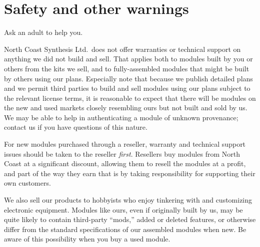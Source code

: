
%
%
%
%
%
%

\chapter{Safety and other warnings}

Ask an adult to help you.

North Coast Synthesis Ltd.\ does not offer warranties or technical support
on anything we did not build and sell.  That applies both to modules built
by you or others from the kits we sell, and to fully-assembled modules that
might be built by others using our plans.  Especially note that because we
publish detailed plans and we permit third parties to build and sell modules
using our plans subject to the relevant license terms, it is reasonable to
expect that there will be modules on the new and used markets closely
resembling ours but not built and sold by us.  We may be able to help in
authenticating a module of unknown provenance; contact us if you have
questions of this nature.

For new modules purchased through a reseller, warranty and technical support
issues should be taken to the reseller \emph{first}.  Resellers buy modules
from North Coast at a significant discount, allowing them to resell the
modules at a profit, and part of the way they earn that is by taking
responsibility for supporting their own customers.

We also sell our products to hobbyists who enjoy tinkering with and
customizing electronic equipment.  Modules like ours, even if originally
built by us, may be quite likely to contain third-party ``mods,'' added or
deleted features, or otherwise differ from the standard specifications of
our assembled modules when new.  Be aware of this possibility when you buy a
used module.

